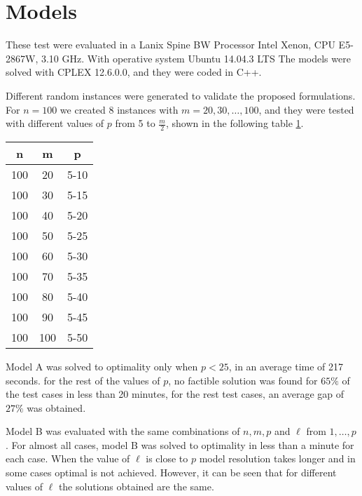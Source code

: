 \section{Models}
%

These test were evaluated in
a Lanix Spine BW Processor Intel Xenon,
CPU E5-2867W, 3.10 GHz.
With operative system Ubuntu 14.04.3 LTS
The models were solved with CPLEX 12.6.0.0,
and they were coded in C++.

Different random instances were generated
to validate the proposed formulations.
For $n = 100$ we created 8 instances with $m = 20,30,\ldots,100$,
and they were tested with different values of $p$ from 5 to $\frac{m}{2}$,
shown in the following table \ref{tab:tests}.
\begin{table}
  \centerign
  \label{tab:tests}
  \begin{tabular}{|c|c|c|}\hline
    n & m & p \\ \hline
    100 & 20 & 5-10 \\
    100 & 30 & 5-15 \\
    100 & 40 & 5-20 \\
    100 & 50 & 5-25 \\
    100 & 60 & 5-30 \\
    100 & 70 & 5-35 \\
    100 & 80 & 5-40 \\
    100 & 90 & 5-45 \\
    100 & 100 & 5-50 \\
    \hline
  \end{tabular}
\end{table}

Model A was solved to optimality only when $p < 25$,
in an average time of 217 seconds.
for the rest of the values of $p$, 
no factible solution was found for $65\%$ of the test cases
in less than 20 minutes,
for the rest test cases,
an average gap of $27\%$ was obtained.

Model B was evaluated
with the same combinations of $n,m,p$
and $\ell$ from $1,\ldots,p$.
For almost all cases,
model B was solved to optimality
in less than a minute for each case.
When the value of $\ell$ 
is close to $p$
model resolution takes longer
and in some cases
optimal is not achieved.
However,
it can be seen
that for different values of $\ell$
the solutions obtained are the same.
